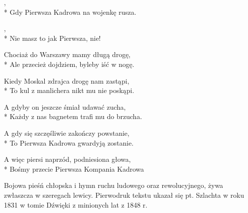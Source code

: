 \begin{lyrics}[longestline={Ale przecież dojdziem, byleby iść w nogę.}]

,\\*
Gdy Pierwsza Kadrowa na wojenkę rusza.

\begin{chorus}
,\\*
Nie masz to jak Pierwsza, nie!
\end{chorus}

Chociaż do Warszawy mamy długą drogę,\\*
Ale przecież dojdziem, byleby iść w nogę.

\chorusref

Kiedy Moskal zdrajca drogę nam zastąpi,\\*
To kul z manlichera nikt mu nie poskąpi.

\chorusref

A gdyby on jeszcze śmiał udawać zucha,\\*
Każdy z nas bagnetem trafi mu do brzucha.

\chorusref

A gdy się szczęśliwie zakończy powstanie,\\*
To Pierwsza Kadrowa gwardyją zostanie.

\chorusref

A więc piersi naprzód, podniesiona głowa,\\*
Bośmy przecie Pierwsza Kompania Kadrowa

\chorusref
\end{lyrics}



\begin{info}Bojowa pieśń chłopska i hymn ruchu ludowego oraz rewolucyjnego, żywa zwłaszcza w szeregach lewicy. Pierwodruk tekstu ukazał się pt. Szlachta w roku 1831 w tomie Dźwięki z minionych lat z 1848 r.\end{info}

